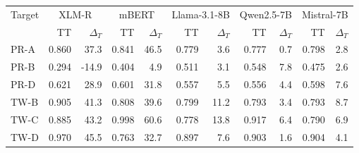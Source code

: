\begin{tabular}{lrrrrrrrrrr}
\toprule
Target & \multicolumn{2}{c}{XLM-R} & \multicolumn{2}{c}{mBERT} & \multicolumn{2}{c}{Llama-3.1-8B} & \multicolumn{2}{c}{Qwen2.5-7B} & \multicolumn{2}{c}{Mistral-7B} \\
 & TT & $\Delta_T$ & TT & $\Delta_T$ & TT & $\Delta_T$ & TT & $\Delta_T$ & TT & $\Delta_T$ \\
\midrule
PR-A & 0.860 & 37.3 & 0.841 & 46.5 & 0.779 & 3.6 & 0.777 & 0.7 & 0.798 & 2.8 \\
PR-B & 0.294 & -14.9 & 0.404 & 4.9 & 0.511 & 3.1 & 0.548 & 7.8 & 0.475 & 2.6 \\
PR-D & 0.621 & 28.9 & 0.601 & 31.8 & 0.557 & 5.5 & 0.556 & 4.4 & 0.598 & 7.6 \\
TW-B & 0.905 & 41.3 & 0.808 & 39.6 & 0.799 & 11.2 & 0.793 & 3.4 & 0.793 & 8.7 \\
TW-C & 0.885 & 43.2 & 0.998 & 60.6 & 0.778 & 13.8 & 0.917 & 6.4 & 0.790 & 6.9 \\
TW-D & 0.970 & 45.5 & 0.763 & 32.7 & 0.897 & 7.6 & 0.903 & 1.6 & 0.904 & 4.1 \\
\bottomrule
\end{tabular}
